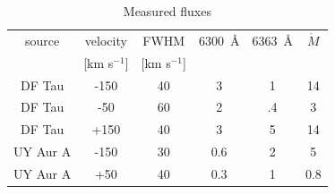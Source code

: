 \documentclass[twocolumn,trackchanges]{aastex63}
\begin{document}
\begin{table}
\caption{Measured fluxes\label{tab:flux}}
\begin{center}
\begin{tabular}{cccccc}
\hline\hline
source & velocity & FWHM & 6300~\AA{} & 6363~\AA{} & $\dot M$\\ 
       & [km s$^{-1}$] & [km s$^{-1}$] & \tablenotemark{a} & \tablenotemark{a} & \tablenotemark{b}\\
\hline
DF Tau & -150 & 40 & 3 & 1 &  14\\
DF Tau & -50 & 60 & 2 & .4 & 3\\
DF Tau & +150 & 40 & 3 & 5 & 14\\
UY Aur A & -150 & 30 & 0.6 & 2 & 5\\
UY Aur A & +50 & 40 & 0.3 & 1 & 0.8\\
\end{tabular}
\end{center}
\end{table}
\end{document}
